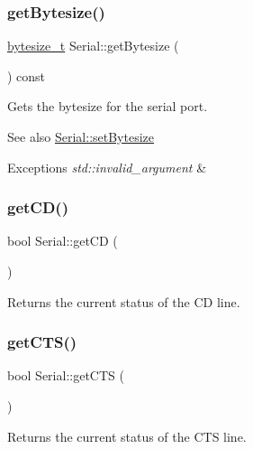 \subsubsection{\texorpdfstring{get\+Bytesize()}{getBytesize()}}
{\footnotesize\ttfamily \mbox{\hyperlink{namespaceserial_a00b3281fa11cea770c0b0c8a106080f8}{bytesize\+\_\+t}} Serial\+::get\+Bytesize (\begin{DoxyParamCaption}{ }\end{DoxyParamCaption}) const}

Gets the bytesize for the serial port.

\begin{DoxySeeAlso}{See also}
\mbox{\hyperlink{classserial_1_1_serial_adba430fd704f6898a5a1d99fd39a94fa}{Serial\+::set\+Bytesize}}
\end{DoxySeeAlso}

\begin{DoxyExceptions}{Exceptions}
{\em std\+::invalid\+\_\+argument} & \\
\hline
\end{DoxyExceptions}
\mbox{\label{classserial_1_1_serial_a9795a3e83e6745a14c64f657e68061fb}} 
\subsubsection{\texorpdfstring{get\+C\+D()}{getCD()}}
{\footnotesize\ttfamily bool Serial\+::get\+CD (\begin{DoxyParamCaption}{ }\end{DoxyParamCaption})}

Returns the current status of the CD line. \mbox{\label{classserial_1_1_serial_a809f048546c4c72b74e205139b97648c}} 
\subsubsection{\texorpdfstring{get\+C\+T\+S()}{getCTS()}}
{\footnotesize\ttfamily bool Serial\+::get\+C\+TS (\begin{DoxyParamCaption}{ }\end{DoxyParamCaption})}

Returns the current status of the C\+TS line. \mbox{\label{classserial_1_1_serial_a6b9a0c485e1fe599dbb5e9e15b1a65d6}} 
